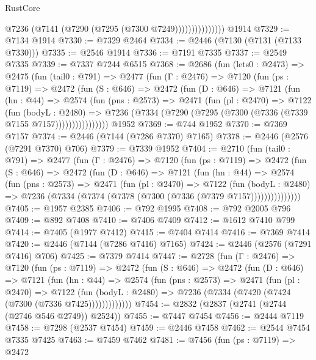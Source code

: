 \begin{lexlean}{RustCore}
\begin{coremodule}
                        @7236 (@7141 (@7290 (@7295 (@7300 @7249)))))))))))))))
    @1914
@7329 := @7134 @1914
@7330 := @7329 @2464
@7334 := @2446 (@7130 (@7131 (@7133 @7330)))
@7335 := @2546 @1914
@7336 := @7191 @7335
@7337 := @2549 @7335
@7339 := @7337 @7244 @6515
@7368 := @2686
    (fun (lets0 : @2473) =>
    @2475
      (fun (tail0 : @791) =>
      @2477
        (fun (Γ : @2476) =>
        @7120
          (fun (ps : @7119) =>
          @2472
            (fun (S : @646) =>
            @2472
              (fun (D : @646) =>
              @7121
                (fun (hn : @44) =>
                @2574
                  (fun (pns : @2573) =>
                  @2471
                    (fun (pl : @2470) =>
                    @7122
                      (fun (bodyL : @2480) =>
                      @7236 (@7334 (@7290 (@7295 (@7300 (@7336 (@7339 @7155 @7157))))))))))))))))
    @1952
@7369 := @744 @1952
@7370 := @7369 @7157
@7374 := @2446 (@7144 (@7286 @7370) @7165)
@7378 := @2446 (@2576 (@7291 @7370) @706)
@7379 := @7339 @1952
@7404 := @2710
    (fun (tail0 : @791) =>
    @2477
      (fun (Γ : @2476) =>
      @7120
        (fun (ps : @7119) =>
        @2472
          (fun (S : @646) =>
          @2472
            (fun (D : @646) =>
            @7121
              (fun (hn : @44) =>
              @2574
                (fun (pns : @2573) =>
                @2471
                  (fun (pl : @2470) =>
                  @7122
                    (fun (bodyL : @2480) =>
                    @7236 (@7334 (@7374 (@7378 (@7300 (@7336 (@7379 @7157)))))))))))))))
@7405 := @1957 @2385
@7406 := @792 @1995
@7408 := @792 @2005 @796
@7409 := @892 @7408
@7410 := @7406 @7409
@7412 := @1612 @7410 @799
@7414 := @7405 (@1977 @7412)
@7415 := @7404 @7414
@7416 := @7369 @7414
@7420 := @2446 (@7144 (@7286 @7416) @7165)
@7424 := @2446 (@2576 (@7291 @7416) @706)
@7425 := @7379 @7414
@7447 := @2728
    (fun (Γ : @2476) =>
    @7120
      (fun (ps : @7119) =>
      @2472
        (fun (S : @646) =>
        @2472
          (fun (D : @646) =>
          @7121
            (fun (hn : @44) =>
            @2574
              (fun (pns : @2573) =>
              @2471
                (fun (pl : @2470) =>
                @7122
                  (fun (bodyL : @2480) =>
                  @7236 (@7334 (@7420 (@7424 (@7300 (@7336 @7425)))))))))))))
@7454 := @2832 (@2837 (@2741 (@2744 (@2746 @546 @2749)) @2524))
@7455 := @7447 @7454
@7456 := @2444 @7119
@7458 := @7298 (@2537 @7454)
@7459 := @2446 @7458
@7462 := @2544 @7454 @7335 @7425
@7463 := @7459 @7462
@7481 := @7456
    (fun (ps : @7119) =>
    @2472

\end{coremodule}
\end{lexlean}
